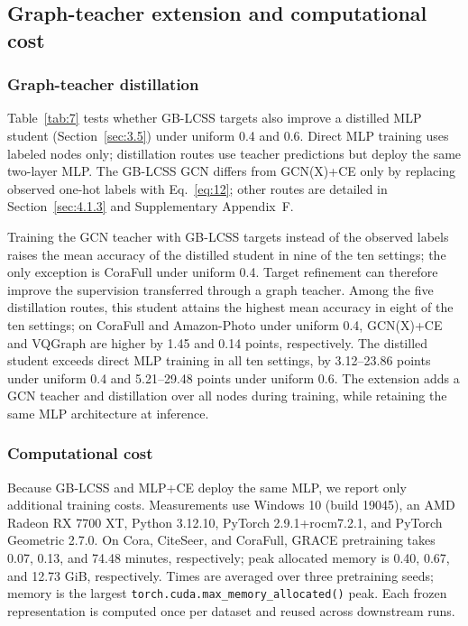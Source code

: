 \documentclass[times,review,10pt]{elsarticle}
\theoremstyle{definition}
\theoremstyle{plain}
\begin{document}
\subsection{Graph-teacher extension and computational cost}\label{sec:4.4}

\subsubsection{Graph-teacher distillation}\label{sec:4.4.1}

Table~\ref{tab:7} tests whether GB-LCSS targets also improve a distilled MLP student (Section~\ref{sec:3.5}) under uniform 0.4 and 0.6. Direct MLP training uses labeled nodes only; distillation routes use teacher predictions but deploy the same two-layer MLP. The GB-LCSS GCN differs from GCN(X)+CE only by replacing observed one-hot labels with Eq.~\eqref{eq:12}; other routes are detailed in Section~\ref{sec:4.1.3} and Supplementary Appendix~F.

\begin{table}[!t]
\centering
\caption{Test accuracy of deployed MLPs under direct training and graph-to-MLP distillation.}\label{tab:7}

\end{table}

Training the GCN teacher with GB-LCSS targets instead of the observed labels raises the mean accuracy of the distilled student in nine of the ten settings; the only exception is CoraFull under uniform 0.4. Target refinement can therefore improve the supervision transferred through a graph teacher. Among the five distillation routes, this student attains the highest mean accuracy in eight of the ten settings; on CoraFull and Amazon-Photo under uniform 0.4, GCN(X)+CE and VQGraph are higher by 1.45 and 0.14 points, respectively. The distilled student exceeds direct MLP training in all ten settings, by 3.12--23.86 points under uniform 0.4 and 5.21--29.48 points under uniform 0.6. The extension adds a GCN teacher and distillation over all nodes during training, while retaining the same MLP architecture at inference.
\subsubsection{Computational cost}\label{sec:4.4.2}

Because GB-LCSS and MLP+CE deploy the same MLP, we report only additional training costs. Measurements use Windows 10 (build 19045), an AMD Radeon RX 7700 XT, Python 3.12.10, PyTorch 2.9.1+rocm7.2.1, and PyTorch Geometric 2.7.0. On Cora, CiteSeer, and CoraFull, GRACE pretraining takes 0.07, 0.13, and 74.48 minutes, respectively; peak allocated memory is 0.40, 0.67, and 12.73 GiB, respectively. Times are averaged over three pretraining seeds; memory is the largest \texttt{torch.\allowbreak cuda.\allowbreak max\_\allowbreak memory\_\allowbreak allocated()} peak. Each frozen representation is computed once per dataset and reused across downstream runs.
\end{document}

